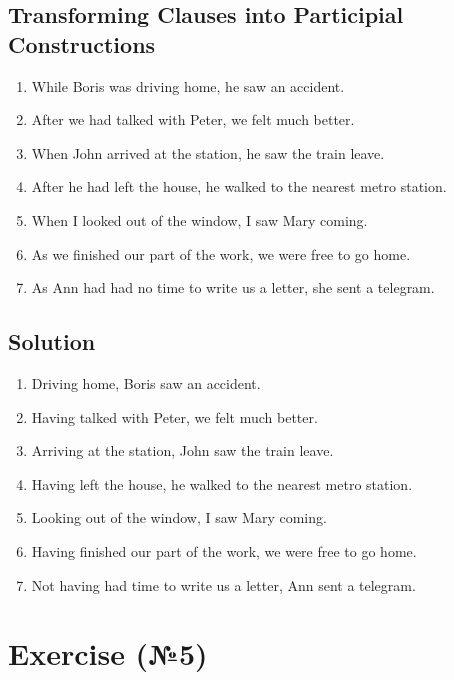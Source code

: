 \subsection*{Transforming Clauses into Participial Constructions}
\begin{enumerate}
      \item While Boris was driving home, he saw an accident.
      \item After we had talked with Peter, we felt much better.
      \item When John arrived at the station, he saw the train leave.
      \item After he had left the house, he walked to the nearest metro station.
      \item When I looked out of the window, I saw Mary coming.
      \item As we finished our part of the work, we were free to go home.
      \item As Ann had had no time to write us a letter, she sent a telegram.
\end{enumerate}

\subsection*{Solution}
\begin{enumerate}
      \item Driving home, Boris saw an accident.
      \item Having talked with Peter, we felt much better.
      \item Arriving at the station, John saw the train leave.
      \item Having left the house, he walked to the nearest metro station.
      \item Looking out of the window, I saw Mary coming.
      \item Having finished our part of the work, we were free to go home.
      \item Not having had time to write us a letter, Ann sent a telegram.
\end{enumerate}

\section{Exercise (№5)}
